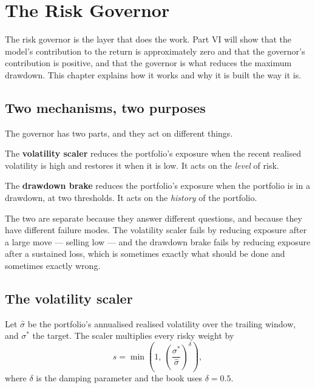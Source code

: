 
\chapter{The Risk Governor}
\label{ch:governor}

The risk governor is the layer that does the work. Part VI will show that
the model's contribution to the return is approximately zero and that the
governor's contribution is positive, and that the governor is what reduces
the maximum drawdown. This chapter explains how it works and why it is
built the way it is.

\section{Two mechanisms, two purposes}

The governor has two parts, and they act on different things.

The \textbf{volatility scaler} reduces the portfolio's exposure when the
recent realised volatility is high and restores it when it is low. It acts
on the \emph{level} of risk.

The \textbf{drawdown brake} reduces the portfolio's exposure when the
portfolio is in a drawdown, at two thresholds. It acts on the
\emph{history} of the portfolio.

The two are separate because they answer different questions, and because
they have different failure modes. The volatility scaler fails by
reducing exposure after a large move --- selling low --- and the drawdown
brake fails by reducing exposure after a sustained loss, which is
sometimes exactly what should be done and sometimes exactly wrong.

\section{The volatility scaler}

Let \(\hat{\sigma}\) be the portfolio's annualised realised volatility
over the trailing window, and \(\sigma^{*}\) the target. The scaler
multiplies every risky weight by
\begin{equation}
s = \min\left(1,\ \left(\frac{\sigma^{*}}{\hat{\sigma}}\right)^{\delta}\right),
\end{equation}
where \(\delta\) is the damping parameter and the book uses \(\delta = 0.5\).

